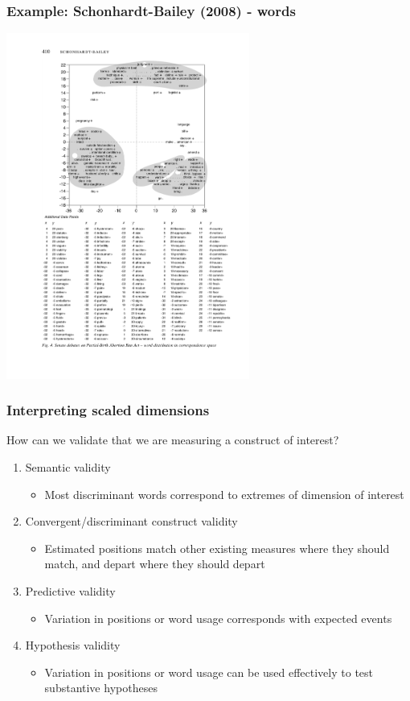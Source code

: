 \documentclass{beamer}
\begin{document}
\begin{frame}
	\frametitle{Example: Schonhardt-Bailey (2008) - words}
	\begin{center}
		\includegraphics[width=8cm]{figures/SBca2.pdf}
	\end{center}
\end{frame}


\begin{frame}
	\frametitle{Interpreting scaled dimensions}
	
	How can we validate that we are measuring a construct of interest?
	\begin{enumerate}[<+->]
		\item Semantic validity
		\begin{itemize}
			\item Most discriminant words correspond to extremes of dimension of interest
		\end{itemize}
		\item Convergent/discriminant construct validity
		\begin{itemize}
			\item Estimated positions match other existing measures where they should match, and depart where they should depart
		\end{itemize}
		\item Predictive validity
		\begin{itemize}
			\item Variation in positions or word usage corresponds with expected events
		\end{itemize}
		\item Hypothesis validity
		\begin{itemize}
			\item Variation in positions or word usage can be used effectively to test substantive hypotheses
		\end{itemize}
	\end{enumerate}
	
\end{frame}
\end{document}
